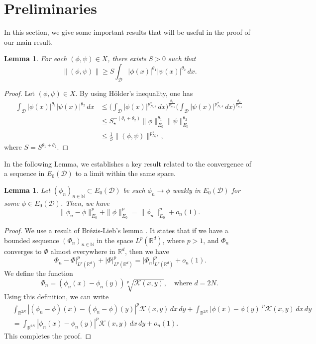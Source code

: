 \documentclass[10pt,a4paper]{amsart}
\numberwithin{equation}{section}
\newtheorem{lemma}[theo]{Lemma}
\begin{document}
\section{Preliminaries}

In this section, we give some important results that will be useful in the proof of 
our main result.

\begin{lemma} 
For each $(\phi,\psi)\in X$, there exists $S>0$ such that
\begin{equation}\label{S}
\| (\phi,\psi)\|\geq S \int_\mathcal{D}
|\phi(x)|^{\theta_1}|\psi(x)|^{\theta_2}\,dx.
\end{equation}
\end{lemma}

\begin{proof}
Let $(\phi,\psi)\in X$. By using  H\"older's inequality, one has
\begin{align*}
\int_\mathcal{D} |\phi(x)|^{\theta_1}|\psi(x)|^{\theta_2}\,dx
&\leq  \Big(\int_\mathcal{D}|\phi(x)|^{p^\star_{N,s}}\,dx
 \Big)^\frac{\theta_1}{p^\star_{N,s}}\Big(\int_\mathcal{D}|\psi(x)|^{p^\star_{N,s}}\,dx\Big)^\frac{\theta_2}{p^\star_{N,s}} \\
&\leq S_\star^{-(\theta_1+\theta_2)}\| \phi\|_{E_0}^{\theta_1}
 \| \psi\|_{E_0}^{\theta_2}\\
&\leq  \frac{1}{S}\| (\phi,\psi)\|^{p^\star_{N,s}},
\end{align*}
where $S=S^{\theta_1+\theta_2}$.
\end{proof}

In the following Lemma, we establishes a key result related to the convergence of 
a sequence in $E_0(\mathcal{D})$ to a limit within the same space.

\begin{lemma}\label{l1}
Let $(\phi_n)_{n\in\mathbb{N}}\subset E_0(\mathcal{D})$ be such $\phi_n\to \phi$
weakly in $E_0(\mathcal{D})$ for some $\phi\in E_0(\mathcal{D})$. 
Then, we have
\[
\| \phi_n-\phi\|_{E_0}^p+\| \phi\|_{E_0}^p
=\| \phi_n\|_{E_0}^p+o_n(1).
\]
\end{lemma}

\begin{proof}
We use a result of Br\'ezis-Lieb's lemma \cite{bb}. 
It states that if we have a bounded sequence $(\Phi_n)_{n\in\mathbb{N}}$ in the space 
$L^p(\mathbb{R}^d)$, where $p>1$, and $\Phi_n$ converges to $\Phi$ almost everywhere 
in $\mathbb{R}^d$, then we have
\[
|\Phi_n-\Phi|_{L^p(\mathbb{R}^d)}^p+|\Phi|_{L^p(\mathbb{R}^d)}^p
=|\Phi_n|_{L^p(\mathbb{R}^d)}^p+o_n(1).
\]
We define the function 
\[
\Phi_n=(\phi_n(x)-\phi_n(y))\sqrt[p]{\mathcal{K}(x,y)}, \quad \text{where } d=2N.
\]
Using this definition, we can write 
\begin{align*}
&\int_{\mathbb{R}^{2N}}|(\phi_n-\phi)(x)-(\phi_n-\phi)(y)|^p\mathcal{K}(x,y)
\,dx\,dy+\int_{\mathbb{R}^{2N}}|\phi(x)-\phi(y)|^p\mathcal{K}(x,y)\,dx\,dy \\
&=\int_{\mathbb{R}^{2N}}|\phi_n(x)-\phi_n(y)|^p\mathcal{K}(x,y)\,dx\,dy+o_n(1).
\end{align*}
This completes the proof.
\end{proof}
\end{document}
